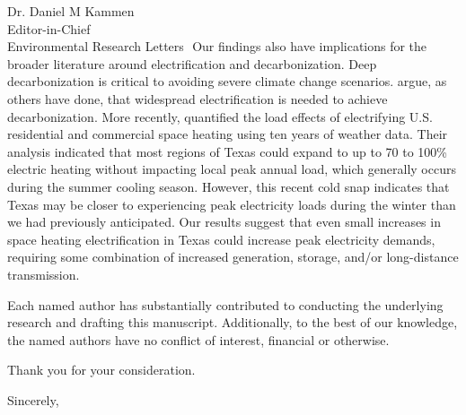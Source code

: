 \documentclass{scrartcl}
\begin{document}
\begin{letter}{Dr. Daniel M Kammen\\Editor-in-Chief\\Environmental Research Letters}
	​
	Our findings also have implications for the broader literature around electrification and decarbonization.
	Deep decarbonization is critical to avoiding severe climate change scenarios.
	\citet{williams_decarbonization:2012} argue, as others have done, that widespread electrification is needed to achieve decarbonization.
	More recently, \citet{waite_heating:2020} quantified the load effects of electrifying U.S. residential and commercial space heating using ten years of weather data.
	Their analysis indicated that most regions of Texas could expand to up to 70 to 100\% electric heating without impacting local peak annual load, which generally occurs during the summer cooling season.
	However, this recent cold snap indicates that Texas may be closer to experiencing peak electricity loads during the winter than we had previously anticipated.
	Our results suggest that even small increases in space heating electrification in Texas could increase peak electricity demands, requiring some combination of increased generation, storage, and/or long-distance transmission.

	Each named author has substantially contributed to conducting the underlying research and drafting this manuscript.
	Additionally, to the best of our knowledge, the named authors have no conflict of interest, financial or otherwise.

	Thank you for your consideration.

	\closing{Sincerely,}

	
	


\end{letter}
\end{document}
